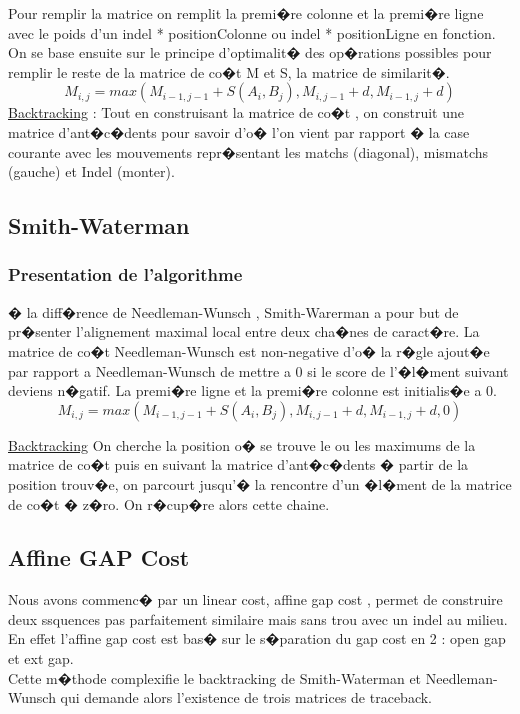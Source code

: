 \documentclass[12pt,a4paper]{article}
\begin{document}
Pour remplir la matrice on remplit la premi�re colonne et la premi�re ligne avec le poids d'un indel * positionColonne ou indel * positionLigne en fonction.
On se base ensuite sur le principe d'optimalit� des op�rations possibles pour remplir le reste de la matrice de co�t M et S, la matrice de similarit�.
\begin{equation*}
M_{i,j} = max(M_{i-1,j-1}+ S(A_{i},B_{j}),M_{i,j-1} + d , M_{i-1,j} + d)
\end{equation*}
\underline{Backtracking} :
Tout en construisant la matrice de co�t , on construit une matrice d'ant�c�dents pour savoir d'o� l'on vient par rapport � la case courante avec les mouvements repr�sentant les matchs (diagonal), mismatchs (gauche) et Indel (monter).

\subsection{Smith-Waterman}
\subsubsection{Presentation de l'algorithme}
� la diff�rence de Needleman-Wunsch , Smith-Warerman a pour but de pr�senter l'alignement maximal local entre deux cha�nes de caract�re. La matrice de co�t Needleman-Wunsch est non-negative d'o� la r�gle ajout�e par rapport a Needleman-Wunsch de mettre a 0 si le score de l'�l�ment suivant deviens n�gatif.
La premi�re ligne et la premi�re colonne est initialis�e a 0.
\begin{equation*}
M_{i,j} = max(M_{i-1,j-1}+ S(A_{i},B_{j}),M_{i,j-1} + d , M_{i-1,j} + d , 0)
\end{equation*}

\underline{Backtracking} On cherche la position o� se trouve le ou les maximums de la matrice de co�t puis en suivant la matrice d'ant�c�dents � partir de la position trouv�e, on parcourt jusqu'� la rencontre d'un �l�ment de la matrice de co�t � z�ro. On r�cup�re alors cette chaine. 


\subsection{Affine GAP Cost}
Nous avons commenc� par un linear cost, affine gap cost , permet de construire deux ssquences pas parfaitement similaire mais sans trou avec un indel au milieu.\\
En effet l'affine gap cost est bas� sur le s�paration du gap cost en 2 : open gap et ext gap.\\
Cette m�thode complexifie le backtracking de Smith-Waterman et Needleman-Wunsch qui demande alors l'existence de trois matrices de traceback.
\end{document}
